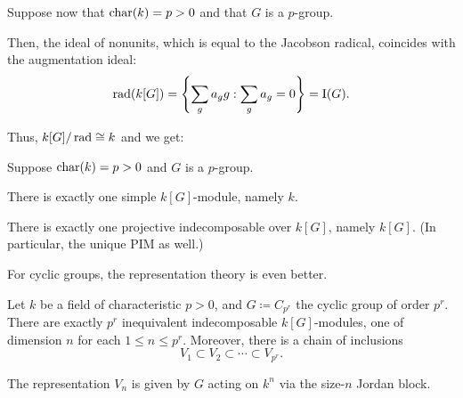 \documentclass[12pt]{article}
\begin{document}
Suppose now that $\operatorname{char}(k) = p > 0$ and that $G$ is a $p$-group.

Then, the ideal of nonunits, which is equal to the Jacobson radical, coincides with the augmentation ideal:
\begin{equation*} 
	\operatorname{rad}(k[G]) = \left\{\sum_{g} a_{g} g : \sum_{g} a_{g} = 0\right\} = \operatorname{I}(G).
\end{equation*}

Thus, $k[G]/\operatorname{rad} \cong k$ and we get:
\begin{thm}
	Suppose $\operatorname{char}(k) = p > 0$ and $G$ is a $p$-group.

	There is exactly one simple $k[G]$-module, namely $k$. 

	There is exactly one projective indecomposable over $k[G]$, namely $k[G]$. 
	(In particular, the unique PIM as well.)
\end{thm}

For cyclic groups, the representation theory is even better.
\begin{thm}
	Let $k$ be a field of characteristic $p > 0$, and $G \coloneqq C_{p^{r}}$ the cyclic group of order $p^{r}$. 
	There are exactly $p^{r}$ inequivalent indecomposable $k[G]$-modules, 
	one of dimension $n$ for each $1 \le n \le p^{r}$. 
	Moreover, there is a chain of inclusions
	\begin{equation*} 
		V_{1} \subset V_{2} \subset \cdots \subset V_{p^{r}}.
	\end{equation*}
\end{thm}
The representation $V_{n}$ is given by $G$ acting on $k^{n}$ via the size-$n$ Jordan block. 
\end{document}

